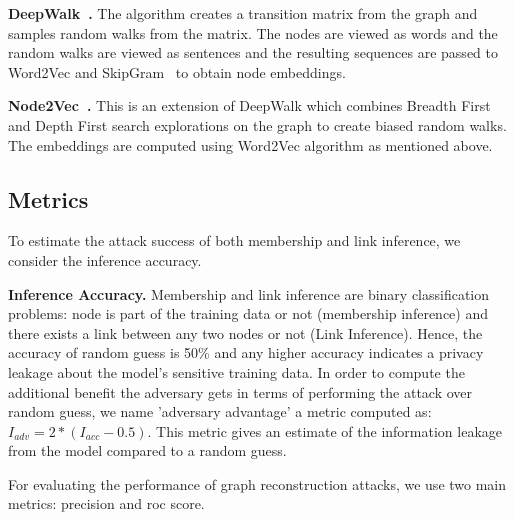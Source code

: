 \noindent\textbf{DeepWalk~\cite{deepwalk}.} The algorithm creates a transition matrix from the graph and samples random walks from the matrix.
The nodes are viewed as words and the random walks are viewed as sentences and the resulting sequences are passed to Word2Vec and SkipGram~\cite{wordemb} to obtain node embeddings.

\noindent\textbf{Node2Vec~\cite{node2vec}.} This is an extension of DeepWalk which combines Breadth First and Depth First search explorations on the graph to create biased random walks.
The embeddings are computed using Word2Vec algorithm as mentioned above.




\subsection{Metrics}


\noindent To estimate the attack success of both membership and link inference, we consider the inference accuracy.

\noindent\textbf{Inference Accuracy.} Membership and link inference are binary classification problems: node is part of the training data or not (membership inference) and there exists a link between any two nodes or not (Link Inference).
Hence, the accuracy of random guess is 50\% and any higher accuracy indicates a privacy leakage about the model's sensitive training data.
In order to compute the additional benefit the adversary gets in terms of performing the attack over random guess, we name 'adversary advantage' a metric computed as: $I_{adv} = 2*(I_{acc}-0.5)$.
This metric gives an estimate of the information leakage from the model compared to a random guess.



\noindent For evaluating the performance of graph reconstruction attacks, we use two main metrics: precision and roc score.

